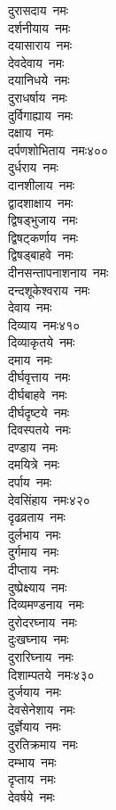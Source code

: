 \begin{multicols}{\maxColumns}
\begin{flushleft}
दुरासदाय~नमः\\
दर्शनीयाय~नमः\\
दयासाराय~नमः\\
देवदेवाय~नमः\\
दयानिधये~नमः\\
दुराधर्षाय~नमः\\
दुर्विगाह्याय~नमः\\
दक्षाय~नमः\\
दर्पणशोभिताय~नमः\hfill ४००\\
दुर्धराय~नमः\\
दानशीलाय~नमः\\
द्वादशाक्षाय~नमः\\
द्विषड्भुजाय~नमः\\
द्विषट्कर्णाय~नमः\\
द्विषड्बाहवे~नमः\\
दीनसन्तापनाशनाय~नमः\\
दन्दशूकेश्वराय~नमः\\
देवाय~नमः\\
दिव्याय~नमः\hfill ४१०\\
दिव्याकृतये~नमः\\
दमाय~नमः\\
दीर्घवृत्ताय~नमः\\
दीर्घबाहवे~नमः\\
दीर्घदृष्टये~नमः\\
दिवस्पतये~नमः\\
दण्डाय~नमः\\
दमयित्रे~नमः\\
दर्पाय~नमः\\
देवसिंहाय~नमः\hfill ४२०\\
दृढव्रताय~नमः\\
दुर्लभाय~नमः\\
दुर्गमाय~नमः\\
दीप्ताय~नमः\\
दुष्प्रेक्ष्याय~नमः\\
दिव्यमण्डनाय~नमः\\
दुरोदरघ्नाय~नमः\\
दुःखघ्नाय~नमः\\
दुरारिघ्नाय~नमः\\
दिशाम्पतये~नमः\hfill ४३०\\
दुर्जयाय~नमः\\
देवसेनेशाय~नमः\\
दुर्ज्ञेयाय~नमः\\
दुरतिक्रमाय~नमः\\
दम्भाय~नमः\\
दृप्ताय~नमः\\
देवर्षये~नमः\\

\end{flushleft}
\end{multicols}
